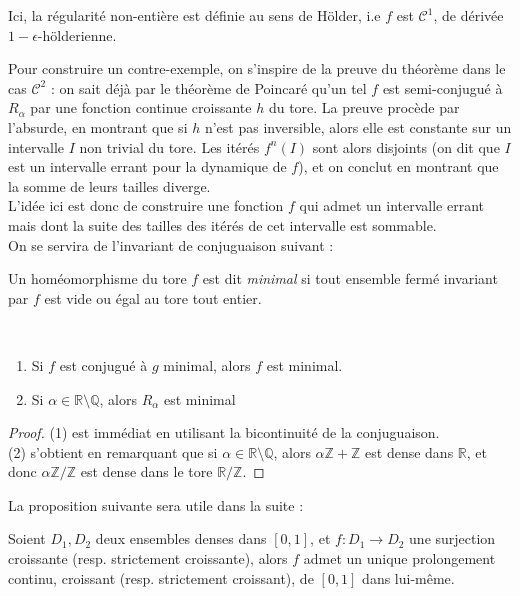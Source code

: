 \documentclass[11pt,a4paper]{article}
\begin{document}
\begin{rmq}
Ici, la  régularité non-entière est définie au sens de Hölder, i.e $f$ est $\mathcal{C}^1$, de dérivée $1-\epsilon$-hölderienne.
\end{rmq}

Pour construire un contre-exemple, on s'inspire de la preuve du théorème dans le cas $\mathcal{C}^2$ : on sait déjà par le théorème de Poincaré qu'un tel $f$ est semi-conjugué à $R_\alpha$ par une fonction continue croissante $h$ du tore. La preuve procède par l'absurde, en montrant que si $h$ n'est pas inversible, alors elle est constante sur un intervalle $I$ non trivial du tore. Les itérés $f^n(I)$ sont alors disjoints (on dit que $I$ est un intervalle errant pour la dynamique de $f$), et on conclut en montrant que la somme de leurs tailles diverge. \\ 
L'idée ici est donc de construire une fonction $f$ qui admet un intervalle errant mais dont la suite des tailles des itérés de cet intervalle est sommable. \\

On se servira de l'invariant de conjuguaison suivant : 

\begin{defin} 
Un homéomorphisme du tore $f$ est dit \textit{minimal} si tout ensemble fermé invariant par  $f$ est vide ou égal au tore tout entier. 
\end{defin}


\begin{prop}\label{minimal} ~
\begin{enumerate}
\item Si $f$ est conjugué à $g$ minimal, alors $f$ est minimal.
\item Si $\alpha \in \mathbb{R} \setminus \mathbb{Q}$, alors $R_\alpha$ est minimal
\end{enumerate}
\end{prop}

\begin{proof}
(1) est immédiat en utilisant la bicontinuité de la conjuguaison. \\
(2) s'obtient en remarquant que si $\alpha \in \mathbb{R} \setminus \mathbb{Q}$, alors $\alpha\mathbb{Z} + \mathbb{Z}$ est dense dans $\mathbb{R}$, et donc $\alpha\mathbb{Z}/\mathbb{Z}$ est dense dans le tore $\mathbb{R}/\mathbb{Z}$. 
\end{proof}

La proposition suivante sera utile dans la suite :


\begin{prop}\label{dense}
Soient $D_1,D_2$ deux ensembles denses dans $[0,1]$, et $f : D_1 \to D_2$ une surjection croissante (resp. strictement croissante), alors $f$ admet un unique prolongement continu, croissant (resp. strictement croissant), de $[0,1]$ dans lui-même.
\end{prop}
\end{document}

